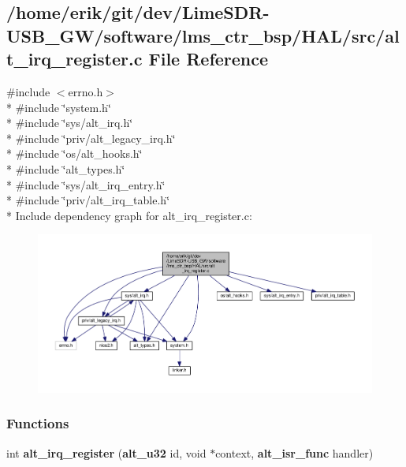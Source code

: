 \subsection{/home/erik/git/dev/\+Lime\+S\+D\+R-\/\+U\+S\+B\+\_\+\+G\+W/software/lms\+\_\+ctr\+\_\+bsp/\+H\+A\+L/src/alt\+\_\+irq\+\_\+register.c File Reference}
\label{alt__irq__register_8c}
{\ttfamily \#include $<$errno.\+h$>$}\\*
{\ttfamily \#include \char`\"{}system.\+h\char`\"{}}\\*
{\ttfamily \#include \char`\"{}sys/alt\+\_\+irq.\+h\char`\"{}}\\*
{\ttfamily \#include \char`\"{}priv/alt\+\_\+legacy\+\_\+irq.\+h\char`\"{}}\\*
{\ttfamily \#include \char`\"{}os/alt\+\_\+hooks.\+h\char`\"{}}\\*
{\ttfamily \#include \char`\"{}alt\+\_\+types.\+h\char`\"{}}\\*
{\ttfamily \#include \char`\"{}sys/alt\+\_\+irq\+\_\+entry.\+h\char`\"{}}\\*
{\ttfamily \#include \char`\"{}priv/alt\+\_\+irq\+\_\+table.\+h\char`\"{}}\\*
Include dependency graph for alt\+\_\+irq\+\_\+register.\+c\+:
\nopagebreak
\begin{figure}[H]
\begin{center}
\leavevmode
\includegraphics[width=350pt]{da/d64/alt__irq__register_8c__incl}
\end{center}
\end{figure}
\subsubsection*{Functions}
\begin{DoxyCompactItemize}
\item 
int {\bf alt\+\_\+irq\+\_\+register} ({\bf alt\+\_\+u32} id, void $\ast$context, {\bf alt\+\_\+isr\+\_\+func} handler)
\end{DoxyCompactItemize}


